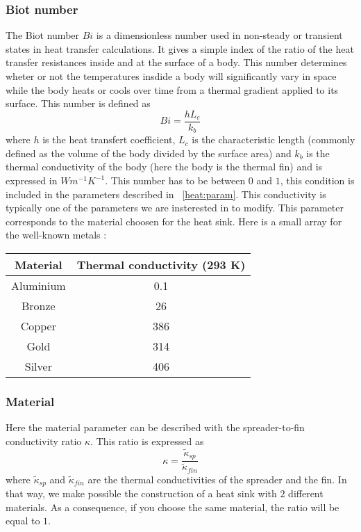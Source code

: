 \subsubsection{Biot number}
The Biot number $Bi$ is a dimensionless number used in non-steady or transient states in heat transfer calculations. It gives a simple index of the ratio of the heat transfer resistances inside  and at the surface of a body. This number determines wheter or not the temperatures insdide a body will significantly vary in space while the body heats or cools over time from a thermal gradient applied to its surface. This number is defined as 
\begin{equation}
Bi = \frac{hL_c}{k_b}
\end{equation} 
where $h$ is the heat transfert coefficient, $L_c$ is the characteristic length (commonly defined as the volume of the body divided by the surface area) and $k_b$ is the thermal conductivity of the body (here the body is the thermal fin) and is expressed in $Wm^{-1}K^{-1}$. This number has to be between $0$ and $1$, this condition is included in the parameters described in ~\ref{heat:param}. This conductivity is typically one of the parameters we are insterested in to modify. This parameter corresponds to the material choosen for the heat sink. Here is a small array for the well-known metals :
\begin{center}
\begin{tabular}{|c|c|}
  \hline
  Material & Thermal conductivity (293 K)\\
  \hline
  \hline
  Aluminium & 0.1 \\
  \hline
  Bronze & 26 \\
  \hline
  Copper & 386 \\
  \hline
  Gold & 314 \\
  \hline
  Silver & 406 \\
  \hline
\end{tabular}
\end{center}

\subsubsection{Material}

Here the material parameter can be described with the spreader-to-fin conductivity ratio $\kappa$. This ratio is expressed as
\begin{equation*}
\displaystyle{\kappa = \frac{\tilde{\kappa}_{sp}}{\tilde{\kappa}_{fin}}}
\end{equation*}
where $\tilde{\kappa}_{sp}$ and $\tilde{\kappa}_{fin}$ are the thermal conductivities of the spreader and the fin. In that way, we make possible the construction of a heat sink with $2$ different materials. As a consequence, if you choose the same material, the ratio will be equal to $1$.

